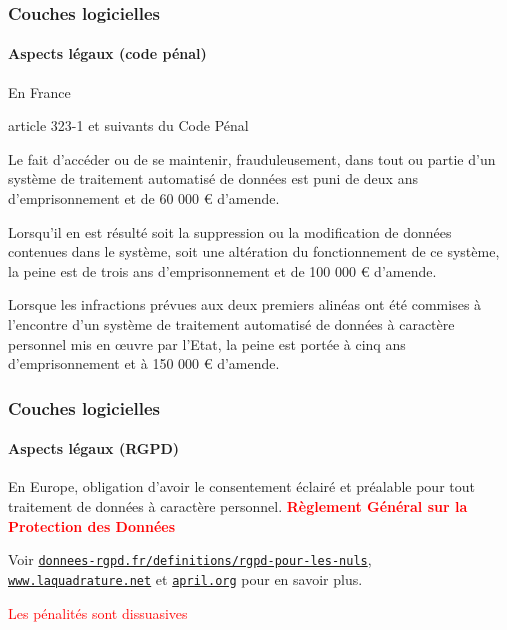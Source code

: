 \documentclass[xcolor=svgnames,final,smaller,a4]{beamer}
\begin{document}
\begin{frame}
  \frametitle{Couches logicielles}
  \framesubtitle{Aspects légaux (code pénal)}

  En France

  
  \begin{block}{article 323-1 et suivants du Code Pénal}

    \begin{relsize}{-0.5}
Le fait d'accéder ou de se maintenir, frauduleusement, dans tout ou
partie d'un système de traitement automatisé de données est puni de
deux ans d'emprisonnement et de 60 000 € d'amende.

Lorsqu'il en est résulté soit la suppression ou la modification de
données contenues dans le système, soit une altération du
fonctionnement de ce système, la peine est de trois ans
d'emprisonnement et de 100 000 € d'amende.

Lorsque les infractions prévues aux deux premiers alinéas ont été
commises à l'encontre d'un système de traitement automatisé de données
à caractère personnel mis en œuvre par l'Etat, la peine est portée à
cinq ans d'emprisonnement et à 150 000 € d'amende.
    \end{relsize}
  \end{block}
\end{frame}



\begin{frame}
  \frametitle{Couches logicielles}
  \framesubtitle{Aspects légaux (RGPD)}

  En Europe, obligation d'avoir le consentement éclairé et préalable
  pour tout traitement de données à caractère
  personnel. \textbf{\textcolor{red}{Règlement Général sur la
      Protection des Données}}

 \vspace{0.5cm}
  Voir
  \href{https://donnees-rgpd.fr/definitions/rgpd-pour-les-nuls/}{\texttt{donnees-rgpd.fr/definitions/rgpd-pour-les-nuls}}, \href{https://www.laquadrature.net}{\texttt{www.laquadrature.net}} et \href{https://april.org/}{\texttt{april.org}} 
  pour en savoir plus.
  
  \vspace{0.5cm}

  \textcolor{red}{Les pénalités sont dissuasives}
\end{frame}
\end{document}
